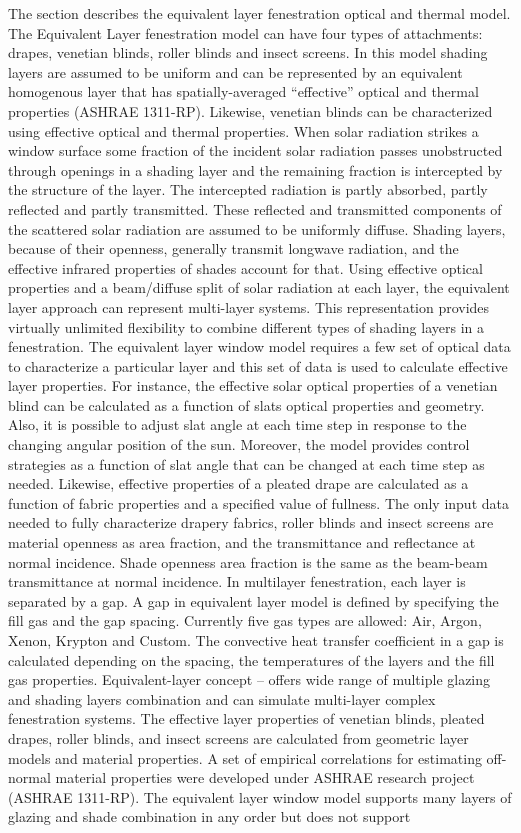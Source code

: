 The section describes the equivalent layer fenestration optical and thermal model. The Equivalent Layer fenestration model can have four types of attachments: drapes, venetian blinds, roller blinds and insect screens. In this model shading layers are assumed to be uniform and can be represented by an equivalent homogenous layer that has spatially-averaged ``effective'' optical and thermal properties (ASHRAE 1311-RP). Likewise, venetian blinds can be characterized using effective optical and thermal properties. When solar radiation strikes a window surface some fraction of the incident solar radiation passes unobstructed through openings in a shading layer and the remaining fraction is intercepted by the structure of the layer. The intercepted radiation is partly absorbed, partly reflected and partly transmitted. These reflected and transmitted components of the scattered solar radiation are assumed to be uniformly diffuse. Shading layers, because of their openness, generally transmit longwave radiation, and the effective infrared properties of shades account for that. Using effective optical properties and a beam/diffuse split of solar radiation at each layer, the equivalent layer approach can represent multi-layer systems. This representation provides virtually unlimited flexibility to combine different types of shading layers in a fenestration. The equivalent layer window model requires a few set of optical data to characterize a particular layer and this set of data is used to calculate effective layer properties. For instance, the effective solar optical properties of a venetian blind can be calculated as a function of slats optical properties and geometry. Also, it is possible to adjust slat angle at each time step in response to the changing angular position of the sun. Moreover, the model provides control strategies as a function of slat angle that can be changed at each time step as needed. Likewise, effective properties of a pleated drape are calculated as a function of fabric properties and a specified value of fullness. The only input data needed to fully characterize drapery fabrics, roller blinds and insect screens are material openness as area fraction, and the transmittance and reflectance at normal incidence. Shade openness area fraction is the same as the beam-beam transmittance at normal incidence. In multilayer fenestration, each layer is separated by a gap. A gap in equivalent layer model is defined by specifying the fill gas and the gap spacing. Currently five gas types are allowed: Air, Argon, Xenon, Krypton and Custom. The convective heat transfer coefficient in a gap is calculated depending on the spacing, the temperatures of the layers and the fill gas properties. Equivalent-layer concept -- offers wide range of multiple glazing and shading layers combination and can simulate multi-layer complex fenestration systems. The effective layer properties of venetian blinds, pleated drapes, roller blinds, and insect screens are calculated from geometric layer models and material properties. A set of empirical correlations for estimating off-normal material properties were developed under ASHRAE research project (ASHRAE 1311-RP). The equivalent layer window model supports many layers of glazing and shade combination in any order but does not support 